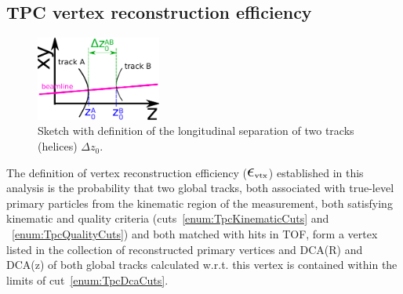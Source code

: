 



\newpage
\subsection{TPC vertex reconstruction efficiency}\label{sec:tpcVxRecoEff}

\begin{figure}\vspace*{-9pt}
  \centering
  \includegraphics[width=0.365\textwidth]{graphics/corrections/deltaZ0Definition2.pdf}
  \caption[Sketch with definition of $\Delta z_{0}$.]
   {Sketch with definition of the longitudinal separation of two tracks (helices) $\Delta z_{0}$.}
   \label{fig:deltaZ0Sketch}\vspace*{-9pt} 
\end{figure}

The definition of vertex reconstruction efficiency ($\mbox{\LARGE$\epsilon$}_{\text{vtx}}$) established in this analysis is the probability that two global tracks, both associated with true-level primary particles from the kinematic region of the measurement, both satisfying kinematic and quality criteria (cuts~\ref{enum:TpcKinematicCuts} and ~\ref{enum:TpcQualityCuts}) and both matched with hits in TOF, form a vertex listed in the collection of reconstructed primary vertices and DCA(R) and DCA(z) of both global tracks calculated w.r.t. this vertex is contained within the limits of cut~\ref{enum:TpcDcaCuts}.


